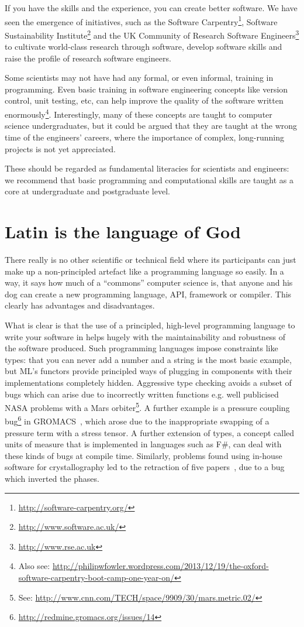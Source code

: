 \documentclass[conference]{IEEEtran}
\begin{document}
If you have the skills and the experience, you can create better
software. We have seen the emergence of initiatives, such as the Software
Carpentry\footnote{\url{http://software-carpentry.org/}}, Software
Sustainability Institute\footnote{\url{http://www.software.ac.uk/}}
and the UK Community of Research Software
Engineers\footnote{\url{http://www.rse.ac.uk}} to cultivate
world-class research through software, develop software skills and
raise the profile of research software engineers.

Some scientists may not have had any formal, or even informal,
training in programming. Even basic training in software engineering
concepts like version control, unit testing, etc, can help improve the
quality of the software written
enormously\cite{Wilson2014}\footnote{Also see:
\url{http://philipwfowler.wordpress.com/2013/12/19/the-oxford-software-carpentry-boot-camp-one-year-on/}}.
Interestingly, many of these concepts are taught to computer science
undergraduates, but it could be argued that they are taught at the
wrong time of the engineers' careers, where the importance of complex,
long-running projects is not yet appreciated.

These should be regarded as fundamental literacies for scientists and
engineers: we recommend that basic programming and computational
skills are taught as a core at undergraduate and postgraduate level.


\section{Latin is the language of God} 

There really is no other scientific or technical field where its
participants can just make up a non-principled artefact like a
programming language so easily. In a way, it says how much of a
``commons'' computer science is, that anyone and his dog can create a
new programming language, API, framework or compiler. This clearly has
advantages and disadvantages.

What is clear is that the use of a principled, high-level programming
language to write your software in helps hugely with the
maintainability and robustness of the software produced. Such
programming languages impose constraints like types: that you can
never add a number and a string is the most basic example, but ML's
functors provide principled ways of plugging in components with their
implementations completely hidden. Aggressive type checking avoids a
subset of bugs which can arise due to incorrectly written functions
e.g. well publicised NASA problems with a Mars orbiter\footnote{See:
\url{http://www.cnn.com/TECH/space/9909/30/mars.metric.02/}}.  A
further example is a pressure coupling
bug\footnote{\url{http://redmine.gromacs.org/issues/14}} in
GROMACS~\cite{Hess2008}, which arose due to the inappropriate swapping
of a pressure term with a stress tensor.  A further extension of
types, a concept called units of measure that is implemented in
languages such as F\#, can deal with these kinds of bugs at compile
time. Similarly, problems found using in-house software for
crystallography led to the retraction of five papers~\cite{Miller2006}, due
to a bug which inverted the phases.
\end{document}
